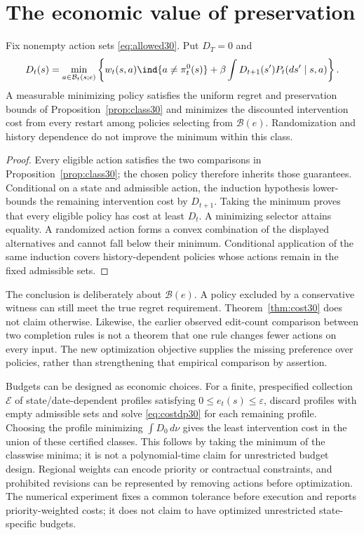 \section{The economic value of preservation}\label{sec:cost30}
\begin{theorem}\label{thm:cost30}
Fix nonempty action sets \eqref{eq:allowed30}. Put $D_T=0$ and
\begin{equation}\label{eq:costdp30}
 D_t(s)=\min_{a\in\mathcal B_t(s;e)}\left\{
 w_t(s,a)\ind\{a\ne\pi_t^0(s)\}+\beta\int D_{t+1}(s')P_t(ds'\mid s,a)\right\}.
\end{equation}
A measurable minimizing policy satisfies the uniform regret and preservation bounds of Proposition~\ref{prop:class30} and minimizes the discounted intervention cost from every restart among policies selecting from $\mathcal B(e)$. Randomization and history dependence do not improve the minimum within this class.
\end{theorem}
\begin{proof}
Every eligible action satisfies the two comparisons in Proposition~\ref{prop:class30}; the chosen policy therefore inherits those guarantees. Conditional on a state and admissible action, the induction hypothesis lower-bounds the remaining intervention cost by $D_{t+1}$. Taking the minimum proves that every eligible policy has cost at least $D_t$. A minimizing selector attains equality. A randomized action forms a convex combination of the displayed alternatives and cannot fall below their minimum. Conditional application of the same induction covers history-dependent policies whose actions remain in the fixed admissible sets.\end{proof}

The conclusion is deliberately about $\mathcal B(e)$. A policy excluded by a conservative witness can still meet the true regret requirement. Theorem~\ref{thm:cost30} does not claim otherwise. Likewise, the earlier observed edit-count comparison between two completion rules is not a theorem that one rule changes fewer actions on every input. The new optimization objective supplies the missing preference over policies, rather than strengthening that empirical comparison by assertion.

Budgets can be designed as economic choices. For a finite, prespecified collection $\mathcal E$ of state/date-dependent profiles satisfying $0\le e_t(s)\le\varepsilon$, discard profiles with empty admissible sets and solve \eqref{eq:costdp30} for each remaining profile. Choosing the profile minimizing $\int D_0\,d\nu$ gives the least intervention cost in the union of these certified classes. This follows by taking the minimum of the classwise minima; it is not a polynomial-time claim for unrestricted budget design. Regional weights can encode priority or contractual constraints, and prohibited revisions can be represented by removing actions before optimization. The numerical experiment fixes a common tolerance before execution and reports priority-weighted costs; it does not claim to have optimized unrestricted state-specific budgets.

